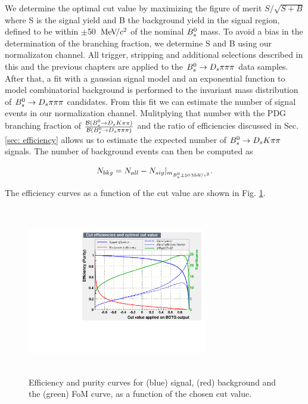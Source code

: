        
We determine the optimal cut value by maximizing the figure of merit $S/\sqrt{S+B}$ where S is the signal yield and B the background yield in the signal region, defined to be within $\pm$50 ${\mathrm{\,Me\kern -0.1em V\!/}c^2}$ of the nominal ${{B}^0_{s}}$ mass. 
To avoid a bias in the determination of the branching fraction, we determine S and B using our normalizaton channel. 
All trigger, stripping and additional selections described in this and the previous chapters are applied to the ${{B}^0_{s}}\rightarrow{\ensuremath{{D}_{s}}}{\ensuremath{\pi}}{\ensuremath{\pi}}{\ensuremath{\pi}}$ data samples. 
After that, a fit with a gaussian signal model and an exponential function to model combinatorial background is performed to the invariant mass distribution of ${{B}^0_{s}}\rightarrow{\ensuremath{{D}_{s}}}{\ensuremath{\pi}}{\ensuremath{\pi}}{\ensuremath{\pi}}$ candidates. 
From this fit we can estimate the number of signal events in our normalization channel. 
Mulitplying that number with the PDG branching fraction of $\frac{\mathcal{B}({{B}^0_{s}}\rightarrow{\ensuremath{{D}_{s}}}{\ensuremath{K}}{\ensuremath{\pi}}{\ensuremath{\pi}})}{\mathcal{B}({{B}^0_{s}}\rightarrow{\ensuremath{{D}_{s}}}{\ensuremath{\pi}}{\ensuremath{\pi}}{\ensuremath{\pi}})}$ and the ratio of efficiencies discussed in Sec. \ref{sec: efficiency} allows us to estimate the expected number of ${{B}^0_{s}}\rightarrow{\ensuremath{{D}_{s}}}{\ensuremath{K}}{\ensuremath{\pi}}{\ensuremath{\pi}}$ signals. The number of background events can then be computed as

\begin{equation}
 N_{bkg}=N_{all}-N_{sig}|_{m_{{{B}^0_{s}}\pm50{\mathrm{\,Me\kern -0.1em V\!/}c^2}}}.   
\end{equation}

The efficiency curves as a function of the cut value are shown in Fig. \ref{fig:BDT_Efficiency}.


\begin{figure}[h]
\includegraphics[height=7.4cm,width=0.7\textwidth]{figs/BDT_CutEfficiency.pdf}
\caption{Efficiency and purity curves for (blue) signal, (red) background and the (green) FoM curve, as a function of the chosen cut value.}
\label{fig:BDT_Efficiency}
\end{figure}
